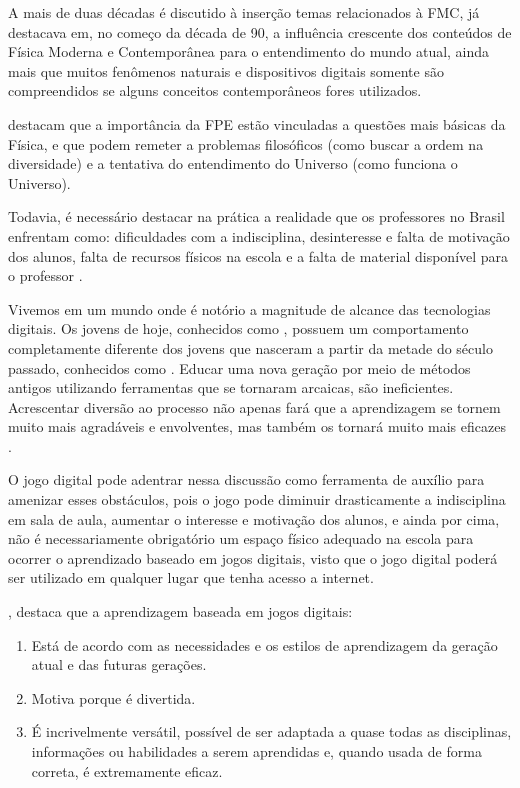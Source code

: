 \documentclass[12pt,fleqn]{book} %
\begin{document}
A mais de duas décadas é discutido à inserção temas relacionados à FMC, \textcite{terrazzan1992inserccao} já destacava em, no começo da década de 90, a influência crescente dos conteúdos de Física Moderna e Contemporânea para o entendimento do mundo atual, ainda mais que muitos fenômenos naturais e dispositivos digitais somente são compreendidos se alguns conceitos contemporâneos fores utilizados.

\textcite{ostermann2001atualizaccao} destacam que a importância da FPE estão vinculadas a questões mais básicas da Física, e que podem remeter a problemas filosóficos (como buscar a ordem na diversidade) e a tentativa do entendimento do Universo (como
funciona o Universo).

Todavia, é necessário destacar na prática a realidade que os professores no Brasil enfrentam como: dificuldades com a indisciplina, desinteresse e falta de motivação dos alunos, falta de recursos físicos na escola e a falta de material disponível para o professor \cite{ostermann2001atualizaccao}. 

Vivemos em um mundo onde é notório a magnitude de alcance das tecnologias digitais. Os jovens de hoje, conhecidos como , possuem um comportamento completamente diferente dos jovens que nasceram a partir da metade do século passado, conhecidos como . Educar uma nova geração por meio de métodos antigos utilizando ferramentas que se tornaram arcaicas, são ineficientes. Acrescentar diversão ao processo não apenas fará que a aprendizagem se tornem muito mais agradáveis e envolventes, mas também os tornará muito mais eficazes \cite{prensky2012aprendizagem}.

O jogo digital pode adentrar nessa discussão como ferramenta de auxílio para amenizar esses obstáculos, pois o jogo pode diminuir drasticamente a indisciplina em sala de aula, aumentar o interesse e motivação dos alunos, e ainda por cima, não é necessariamente obrigatório um espaço físico adequado na escola para ocorrer o aprendizado baseado em jogos digitais, visto que o jogo digital poderá ser utilizado em qualquer lugar que tenha acesso a internet.

\textcite{prensky2012aprendizagem}, destaca que a aprendizagem baseada em jogos digitais:

\begin{enumerate}
		\item Está de acordo com as necessidades e os estilos de aprendizagem da geração atual e das futuras gerações.
		\item Motiva porque é divertida.
		\item É incrivelmente versátil, possível de ser adaptada a quase todas as disciplinas, informações ou habilidades a serem aprendidas e, quando usada de forma correta, é extremamente eficaz.
\end{enumerate}
\end{document}
